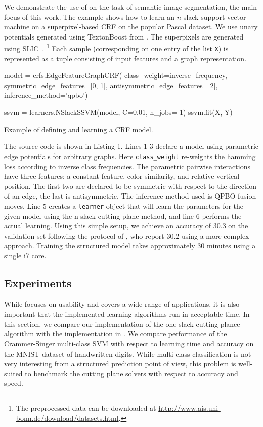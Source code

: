 We demonstrate the use of \pystruct on the task of semantic image segmentation,
the main focus of this work. The example shows how to learn an $n$-slack support
vector machine on a superpixel-based CRF on the popular Pascal dataset. We use
unary potentials generated using TextonBoost
from \citet{krahenbuhl2012efficient}. The superpixels are generated using SLIC~\citep{achanta2012slic}.%
\footnote{The preprocessed data can be downloaded at \url{http://www.ais.uni-bonn.de/download/datasets.html}.}
Each sample (corresponding on one entry of the list \texttt{X}) is represented as a
tuple consisting of input features and a graph representation.
\begin{listing}[t]
\begin{pythoncode}
model = crfs.EdgeFeatureGraphCRF(
            class_weight=inverse_frequency,
            symmetric_edge_features=[0, 1],
            antisymmetric_edge_features=[2],
            inference_method='qpbo')

ssvm = learners.NSlackSSVM(model, C=0.01, n_jobs=-1)
ssvm.fit(X, Y)
\end{pythoncode}
\caption{Example of defining and learning a CRF model.\label{lst:stuff}}
\end{listing}

The source code is shown in Listing 1.
Lines 1-3 declare a model using parametric edge potentials for arbitrary graphs.
Here \texttt{class\_weight} re-weights the hamming loss according to inverse class
frequencies. The parametric pairwise interactions have three features: a
constant feature, color similarity, and relative vertical position. The first two
are declared to be symmetric with respect to the direction of an edge, the last
is antisymmetric. The inference method used is QPBO-fusion moves.  Line 5
creates a \texttt{learner} object that will learn the parameters for the given
model using the n-slack cutting plane method, and line 6 performs the actual
learning.  Using this simple setup, we achieve an accuracy of 30.3 on the
validation set following the protocol of \citet{krahenbuhl2012efficient}, who
report 30.2 using a more complex approach. Training the structured model takes
approximately 30 minutes using a single i7 core.

\subsection{Experiments}\label{sec:benchmarks}
While \pystruct focuses on usability and covers a wide range of applications, it is also
important that the implemented learning algorithms run in acceptable time.
In this section, we compare our implementation of the one-slack cutting plance
algorithm with the implementation in \svmstruct.
We compare performance of the Crammer-Singer multi-class SVM with respect to
learning time and accuracy on the MNIST dataset of handwritten digits.
While multi-class classification is not very interesting from a structured
prediction point of view, this problem is well-suited to benchmark the cutting
plane solvers with respect to accuracy and speed.

